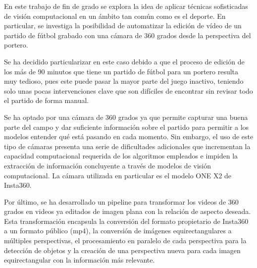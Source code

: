 En este trabajo de fin de grado se explora la idea de aplicar técnicas sofisticadas de visión computacional en un ámbito tan común como es el deporte. En particular, se investiga la posibilidad de automatizar la edición de vídeo de un partido de fútbol grabado con una cámara de 360 grados desde la perspectiva del portero.

Se ha decidido particularizar en este caso debido a que el proceso de edición de los más de 90 minutos que tiene un partido de fútbol para un portero resulta muy tedioso, pues este puede pasar la mayor parte del juego inactivo, teniendo solo unas pocas intervenciones clave que son difíciles de encontrar sin revisar todo el partido de forma manual.

Se ha optado por una cámara de 360 grados ya que permite capturar una buena parte del campo y dar suficiente información sobre el partido para permitir a los modelos entender qué está pasando en cada momento. Sin embargo, el uso de este tipo de cámaras presenta una serie de dificultades adicionales que incrementan la capacidad computacional requerida de los algoritmos empleados e impiden la extracción de información concluyente a través de modelos de visión computacional. La cámara utilizada en particular es el modelo ONE X2 de Insta360.

Por último, se ha desarrollado un pipeline para transformar los videos de 360 grados en videos ya editados de imagen plana con la relación de aspecto deseada. Esta transformación encapsula la conversión del formato propietario de Insta360 a un formato público (mp4), la conversión de imágenes equirectangulares a múltiples perspectivas, el procesamiento en paralelo de cada perspectiva para la detección de objetos y la creación de una perspectiva nueva para cada imagen equirectangular con la información más relevante.
